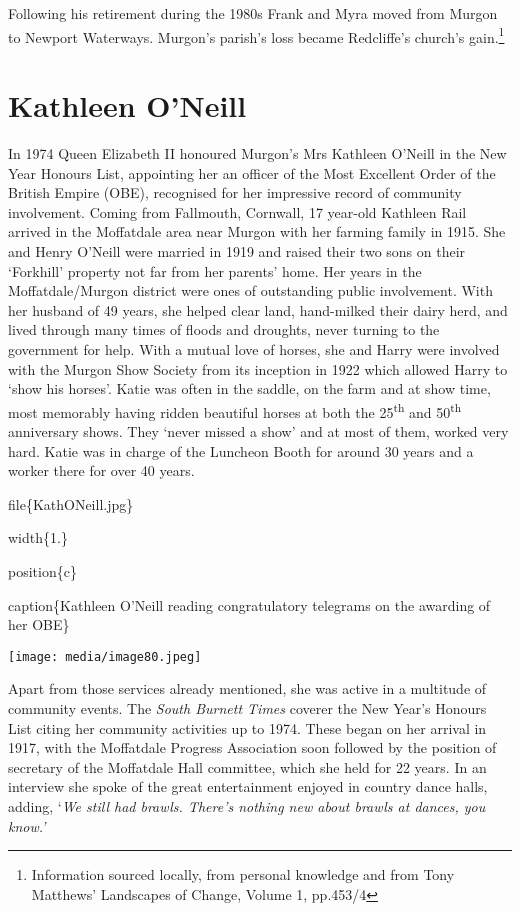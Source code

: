 Following his retirement during the 1980s Frank and Myra moved from Murgon to Newport Waterways. Murgon's parish's loss became Redcliffe's church's gain.\footnote{Information sourced locally, from personal knowledge and from Tony Matthews' Landscapes of Change, Volume 1, pp.453/4}

\hypertarget{kathleen-oneill}{%
\section{Kathleen O'Neill}\label{kathleen-oneill}}

In 1974 Queen Elizabeth II honoured Murgon's Mrs Kathleen O'Neill in the New Year Honours List, appointing her an officer of the Most Excellent Order of the British Empire (OBE), recognised for her impressive record of community involvement. Coming from Fallmouth, Cornwall, 17 year-old Kathleen Rail arrived in the Moffatdale area near Murgon with her farming family in 1915. She and Henry O'Neill were married in 1919 and raised their two sons on their `Forkhill' property not far from her parents' home. Her years in the Moffatdale/Murgon district were ones of outstanding public involvement. With her husband of 49 years, she helped clear land, hand-milked their dairy herd, and lived through many times of floods and droughts, never turning to the government for help. With a mutual love of horses, she and Harry were involved with the Murgon Show Society from its inception in 1922 which allowed Harry to `show his horses'. Katie was often in the saddle, on the farm and at show time, most memorably having ridden beautiful horses at both the 25\textsuperscript{th} and 50\textsuperscript{th} anniversary shows. They `never missed a show' and at most of them, worked very hard. Katie was in charge of the Luncheon Booth for around 30 years and a worker there for over 40 years.

file\{KathONeill.jpg\}

width\{1.\}

position\{c\}

caption\{Kathleen O'Neill reading congratulatory telegrams on the awarding of her OBE\}

\texttt{[image: media/image80.jpeg]}

Apart from those services already mentioned, she was active in a multitude of community events. The \emph{South Burnett Times} coverer the New Year's Honours List citing her community activities up to 1974. These began on her arrival in 1917, with the Moffatdale Progress Association soon followed by the position of secretary of the Moffatdale Hall committee, which she held for 22 years. In an interview she spoke of the great entertainment enjoyed in country dance halls, adding, `\emph{We still had brawls. There's nothing new about brawls at dances, you know.'}

